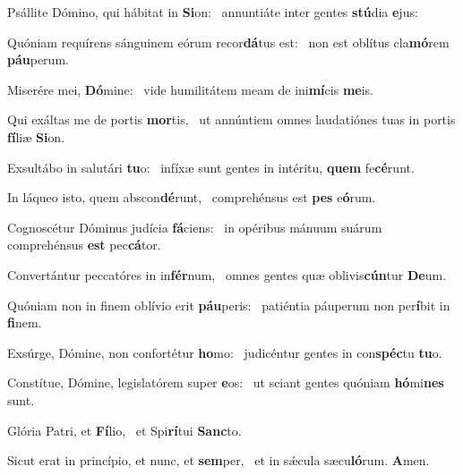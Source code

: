 \item Psállite Dómino, qui hábitat in \textbf{Si}on:~\psstar{} annuntiáte inter gentes \textbf{stú}dia \textbf{e}jus:
\item Quóniam requírens sánguinem eórum recor\textbf{dá}tus est:~\psstar{} non est oblítus cla\textbf{mó}rem \textbf{páu}perum.
\item Miserére mei, \textbf{Dó}mine:~\psstar{} vide humilitátem meam de ini\textbf{mí}cis \textbf{me}is.
\item Qui exáltas me de portis \textbf{mor}tis,~\psstar{} ut annúntiem omnes laudatiónes tuas in portis \textbf{fí}liæ \textbf{Si}on.
\item Exsultábo in salutári \textbf{tu}o:~\psstar{} infíxæ sunt gentes in intéritu, \textbf{quem} fe\textbf{cé}runt.
\item In láqueo isto, quem abscon\textbf{dé}runt,~\psstar{} comprehénsus est \textbf{pes} e\textbf{ó}rum.
\item Cognoscétur Dóminus judícia \textbf{fá}ciens:~\psstar{} in opéribus mánuum suárum comprehénsus \textbf{est} pec\textbf{cá}tor.
\item Convertántur peccatóres in in\textbf{fér}num,~\psstar{} omnes gentes quæ oblivis\textbf{cún}tur \textbf{De}um.
\item Quóniam non in finem oblívio erit \textbf{páu}peris:~\psstar{} patiéntia páuperum non per\textbf{í}bit in \textbf{fi}nem.
\item Exsúrge, Dómine, non confortétur \textbf{ho}mo:~\psstar{} judicéntur gentes in con\textbf{spéc}tu \textbf{tu}o.
\item Constítue, Dómine, legislatórem super \textbf{e}os:~\psstar{} ut sciant gentes quóniam \textbf{hó}mi\textbf{nes} sunt.
\item Glória Patri, et \textbf{Fí}lio,~\psstar{} et Spi\textbf{rí}tui \textbf{Sanc}to.
\item Sicut erat in princípio, et nunc, et \textbf{sem}per,~\psstar{} et in sǽcula sæcu\textbf{ló}rum. \textbf{A}men.
